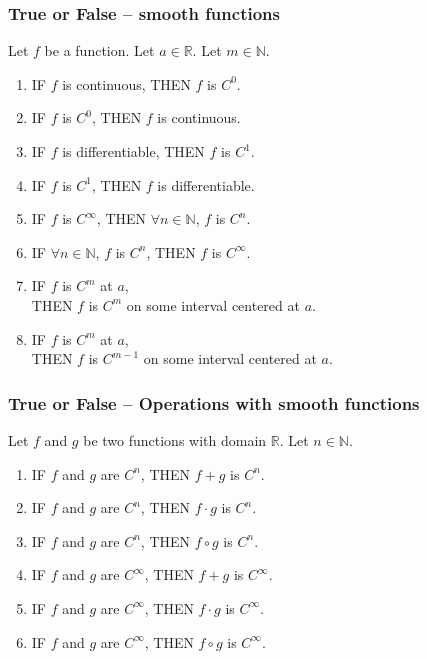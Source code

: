 \documentclass[14pt]{beamer}
\begin{document}
\begin{frame}[t]
	\frametitle{True or False -- smooth functions}

	Let $f$ be a function. Let $a \in \mathbb{R}$. Let $m \in \mathbb{N}$.
	\vspace{.2cm}
	\begin{enumerate}
		\item IF $f$ is continuous, \; THEN $f$ is $C^{0}$.

		\item IF $f$ is $C^{0}$, \; THEN $f$ is continuous.

		\item IF $f$ is differentiable, \; THEN $f$ is $C^{1}$.

		\item IF $f$ is $C^{1}$, \; THEN $f$ is differentiable.

		\item IF $f$ is $C^{\infty}$, \; THEN $\forall n \in \mathbb{N}$, $f$ is $C^{n}$.

		\item IF $\forall n \in \mathbb{N}$, $f$ is $C^{n}$, \; THEN $f$ is $C^{\infty}$.

		\item IF $f$ is $C^{m}$ at $a$, \\ \; THEN $f$ is $C^{m}$ on some interval
			centered at $a$.

		\item IF $f$ is $C^{m}$ at $a$, \\ \; THEN $f$ is $C^{m-1}$ on some interval
			centered at $a$.
	\end{enumerate}
\end{frame}

\begin{frame}[t]
	\frametitle{True or False -- Operations with smooth functions}

	Let $f$ and $g$ be two functions with domain $\mathbb{R}$. Let $n \in \mathbb{N}$.
	\vspace{.2cm}

	\begin{enumerate}
		\item IF $f$ and $g$ are $C^{n}$, \; THEN $f + g$ is $C^{n}$.

		\item IF $f$ and $g$ are $C^{n}$, \; THEN $f \cdot g$ is $C^{n}$.

		\item IF $f$ and $g$ are $C^{n}$, \; THEN $f \circ g$ is $C^{n}$.

		\item IF $f$ and $g$ are $C^{\infty}$, \; THEN $f + g$ is $C^{\infty}$.

		\item IF $f$ and $g$ are $C^{\infty}$, \; THEN $f \cdot g$ is $C^{\infty}$.

		\item IF $f$ and $g$ are $C^{\infty}$, \; THEN $f \circ g$ is $C^{\infty}$.
	\end{enumerate}
\end{frame}
\end{document}
